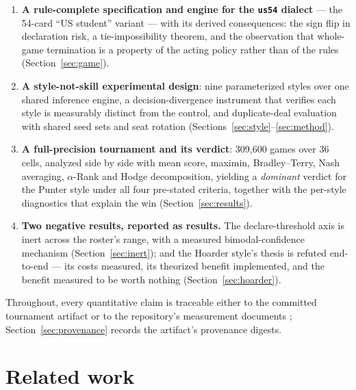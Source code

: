\documentclass[11pt]{article}
\newcommand{\code}[1]{\texttt{#1}}
\newcommand{\usff}{\code{us54}}
\begin{document}
\begin{enumerate}
\item \textbf{A rule-complete specification and engine for the \usff{} dialect} --- the
  54-card ``US student'' variant --- with its derived consequences: the sign flip in
  declaration risk, a tie-impossibility theorem, and the observation that whole-game
  termination is a property of the acting policy rather than of the rules
  (Section~\ref{sec:game}).
\item \textbf{A style-not-skill experimental design}: nine parameterized styles over one
  shared inference engine, a decision-divergence instrument that verifies each style is
  measurably distinct from the control, and duplicate-deal evaluation with shared seed sets
  and seat rotation (Sections~\ref{sec:style}--\ref{sec:method}).
\item \textbf{A full-precision tournament and its verdict}: 309{,}600 games over 36 cells,
  analyzed side by side with mean score, maximin, Bradley--Terry, Nash averaging,
  $\alpha$-Rank and Hodge decomposition, yielding a \emph{dominant} verdict for the Punter
  style under all four pre-stated criteria, together with the per-style diagnostics that
  explain the win (Section~\ref{sec:results}).
\item \textbf{Two negative results, reported as results.} The declare-threshold axis is inert
  across the roster's range, with a measured bimodal-confidence mechanism
  (Section~\ref{sec:inert}); and the Hoarder style's thesis is refuted end-to-end --- its
  costs measured, its theorized benefit implemented, and the benefit measured to be worth
  nothing (Section~\ref{sec:hoarder}).
\end{enumerate}

Throughout, every quantitative claim is traceable either to the committed tournament artifact
\cite{artifact} or to the repository's measurement documents
\cite{rules,styles,botlab,containment}; Section~\ref{sec:provenance} records the artifact's
provenance digests.

\section{Related work}
\label{sec:related}
\end{document}
